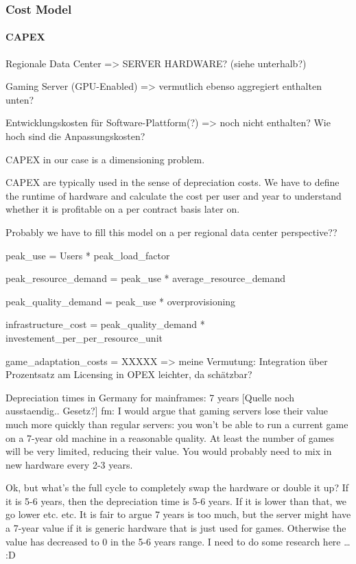 \subsubsection{Cost Model}

\paragraph{CAPEX}

Regionale Data Center => SERVER HARDWARE? (siehe unterhalb?)

Gaming Server (GPU-Enabled) => vermutlich ebenso aggregiert enthalten unten?

Entwicklungskosten für Software-Plattform(?) => noch nicht enthalten? Wie hoch sind die Anpassungskosten?

CAPEX in our case is a dimensioning problem.

CAPEX are typically used in the sense of depreciation costs. We have to define the runtime of hardware and calculate the cost per user and year to understand whether it is profitable on a per contract basis later on.

Probably we have to fill this model on a per regional data center perspective??

peak\_use = Users * peak\_load\_factor

peak\_resource\_demand = peak\_use * average\_resource\_demand

peak\_quality\_demand = peak\_use * overprovisioning

infrastructure\_cost = peak\_quality\_demand * investement\_per\_per\_resource\_unit

game\_adaptation\_costs = XXXXX => meine Vermutung: Integration über Prozentsatz am Licensing in OPEX leichter, da schätzbar?

Depreciation times in Germany for mainframes: 7 years [Quelle noch ausstaendig.. Gesetz?]
fm: I would argue that gaming servers lose their value much more quickly than regular servers: you won’t be able to run a current game on a 7-year old machine in a reasonable quality. At least the number of games will be very limited, reducing their value. 
You would probably need to mix in new hardware every 2-3 years.

Ok, but what’s the full cycle to completely swap the hardware or double it up? If it is 5-6 years, then the depreciation time is 5-6 years. If it is lower than that, we go lower etc. etc. It is fair to argue 7 years is too much, but the server might have a 7-year value if it is generic hardware that is just used for games. Otherwise the value has decreased to 0 in the 5-6 years range. I need to do some research here … :D

